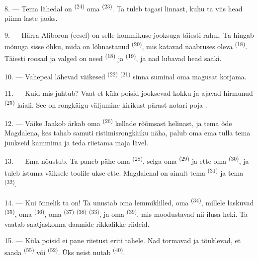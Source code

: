 8. --- Tema lähedal on  \textsuperscript{(24)} oma
 \textsuperscript{(23)}. Ta tuleb tagasi linnast, kuhu ta viis head
piima laste jaoks.

\VUsaut{4.0mm}
\VUsaut{3.4mm}

9. --- Härra Aliboron (eesel) on selle hommikuse jooksuga täiesti rahul. Ta hingab
mõnuga sisse õhku, mida on lõhnastanud  \textsuperscript{(20)}, mis katavad
naabruses oleva   \textsuperscript{(18)}. Täiesti
roosad ja valged on need  \textsuperscript{(18)} ja
 \textsuperscript{(19)}, ja nad lubavad head saaki.

10. --- Vahepeal lähevad väikesed  \textsuperscript{(22)}
 \textsuperscript{(21)} sinna suminal oma magusat 
korjama.

11. --- Kuid mis juhtub? Vaat et küla poisid jooksevad kokku ja ajavad hirmunud
 \textsuperscript{(25)} laiali. See on rongkäigu väljumine kirikust pärast
notari poja .

12. --- Väike Jaakob ärkab oma  \textsuperscript{(26)} kellade rõõmsast
helinast, ja tema õde Magdalena, kes tahab samuti ristimisrongkäiku näha, palub oma
ema tulla tema juukseid kammima ja teda riietama maja lävel.

13. --- Ema nõustub. Ta paneb pähe oma  \textsuperscript{(28)}, selga oma
 \textsuperscript{(29)} ja ette oma  \textsuperscript{(30)},
ja tuleb istuma väiksele toolile ukse ette. Magdalenal on ainult tema
 \textsuperscript{(31)} ja tema 
\textsuperscript{(32)}.

14. --- Kui õnnelik ta on! Ta unustab oma lemmiklilled, oma 
\textsuperscript{(34)}, millele laskuvad  \textsuperscript{(35)}, oma
 \textsuperscript{(36)}, oma  \textsuperscript{(37)}
 \textsuperscript{(38)}  \textsuperscript{(33)}, ja oma
 \textsuperscript{(39)}, mis moodustavad nii ilusa heki. Ta vaatab
saatjaskonna daamide rikkalikke riideid.

15. --- Küla poisid ei pane riietust eriti tähele. Nad tormavad ja tõuklevad, et
saada  \textsuperscript{(55)} või  \textsuperscript{(52)}.
Üks neist nutab \textsuperscript{(40)}.

